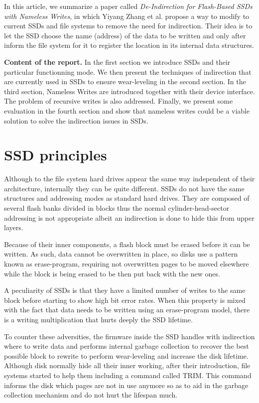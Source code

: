 \documentclass[twocolumn,a4paper,10pt]{article}
\begin{document}
In this article, we summarize a paper called \textit{De-Indirection for
	Flash-Based SSDs with Nameless Writes}, in which Yiyang Zhang et al.
propose a way to modify to current SSDs and file systems to remove the need
for indirection. Their idea is to let the SSD choose the name (address) of the
data to be written and only after inform the file system for it to register
the location in its internal data structures.

\noindent
\textbf{Content of the report.} In the first section we introduce SSDs and their
particular functionning mode. We then present the techniques of indirection
that are currently used in SSDs to ensure wear-leveling in the second section.
In the third section, Nameless Writes are introduced together with their
device interface. The problem of recursive writes is also addressed.
Finally, we present some evaluation in the fourth section and show that
nameless writes could be a viable solution to solve the indirection issues
in SSDs.

\section*{SSD principles}
Although to the file system hard drives appear the same way independent of
their architecture, internally they can be quite different. SSDs do not have
the same structures and addressing modes as standard hard drives. They are
composed of several flash banks divided in blocks thus the normal
cylinder-head-sector addressing is not appropriate albeit an indirection is
done to hide this from upper layers.

Because of their inner components, a flash block must be erased before it can
be written. As such, data cannot be overwritten in place, so disks use a
pattern known as erase-program, requiring not overwritten pages to be moved
elsewhere while the block is being erased to be then put back with the new
ones.

A peculiarity of SSDs is that they have a limited number of writes to the same
block before starting to show high bit error rates. When this property is
mixed with the fact that data needs to be written using an erase-program
model, there is a writing multiplication that hurts deeply the SSD lifetime.

To counter these adversities, the firmware inside the SSD handles with
indirection where to write data and performs internal garbage collection to
recover the best possible block to rewrite to perform wear-leveling and
increase the disk lifetime. Although disk normally hide all their inner
working, after their introduction, file systems started to help them
including a command called TRIM. This command informs the disk which pages are
not in use anymore so as to aid in the garbage collection mechanism and do not
hurt the lifespan much.
\end{document}
